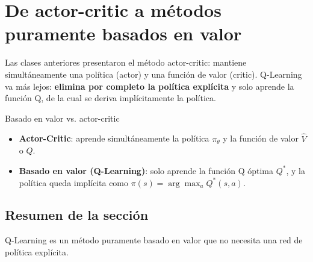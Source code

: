 \section{De actor-critic a métodos puramente basados en valor}

Las clases anteriores presentaron el método actor-critic: mantiene simultáneamente una política (actor) y una función de valor (critic). Q-Learning va más lejos: \textbf{elimina por completo la política explícita} y solo aprende la función Q, de la cual se deriva implícitamente la política.

\begin{knowledgebox}{Basado en valor vs. actor-critic}
\begin{itemize}
    \item \textbf{Actor-Critic}: aprende simultáneamente la política $\pi_\theta$ y la función de valor $\hat{V}$ o $\hat{Q}$.
    \item \textbf{Basado en valor (Q-Learning)}: solo aprende la función Q óptima $Q^*$, y la política queda implícita como $\pi(s) = \arg\max_a Q^*(s, a)$.
\end{itemize}
\end{knowledgebox}

\subsection{Resumen de la sección}

Q-Learning es un método puramente basado en valor que no necesita una red de política explícita.

